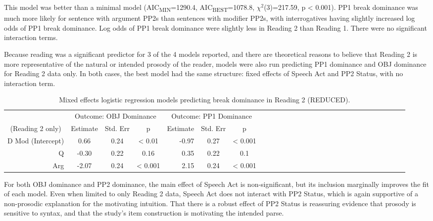 \documentclass[12pt,oneside]{book}
\begin{document}
This model was better than a minimal model (AIC\textsubscript{MIN}=1290.4, AIC\textsubscript{BEST}=1078.8, \(\chi^2\)(3)=217.59, p \textless{} 0.001). PP1 break dominance was much more likely for sentence with argument PP2s than sentences with modifier PP2s, with interrogatives having slightly increased log odds of PP1 break dominance. Log odds of PP1 break dominance were slightly less in Reading 2 than Reading 1. There were no significant interaction terms.

Because reading was a significant predictor for 3 of the 4 models reported, and there are theoretical reasons to believe that Reading 2 is more representative of the natural or intended prosody of the reader, models were also run predicting PP1 dominance and OBJ dominance for Reading 2 data only. In both cases, the best model had the same structure: fixed effects of Speech Act and PP2 Status, with no interaction term.

\begin{table}[!h]

\caption{\label{tab:r2dom}Mixed effects logistic regression models predicting break dominance in Reading 2 (REDUCED).}
\centering
\begin{tabular}{rcccrcccrcccrcccrcccrcccrccc}
\toprule
\multicolumn{1}{c}{ } & \multicolumn{3}{c}{Outcome: OBJ Dominance} & \multicolumn{3}{c}{Outcome: PP1 Dominance} \\
\cmidrule(l{3pt}r{3pt}){2-4} \cmidrule(l{3pt}r{3pt}){5-7}
\multicolumn{1}{c}{(Reading 2 only)} & \multicolumn{1}{c}{Estimate} & \multicolumn{1}{c}{Std. Err} & \multicolumn{1}{c}{p} & \multicolumn{1}{c}{Estimate} & \multicolumn{1}{c}{Std. Err} & \multicolumn{1}{c}{p}\\
\midrule
D Mod (Intercept) & 0.66 & 0.24 & < 0.01 & -0.97 & 0.27 & < 0.001\\
Q & -0.30 & 0.22 & 0.16 & 0.35 & 0.22 & 0.1\\
Arg & -2.07 & 0.24 & < 0.001 & 2.15 & 0.24 & < 0.001\\
\bottomrule
\end{tabular}
\end{table}

For both OBJ dominance and PP2 dominance, the main effect of Speech Act is non-significant, but its inclusion marginally improves the fit of each model. Even when limited to only Reading 2 data, Speech Act does not interact with PP2 Status, which is again supportive of a non-prosodic explanation for the motivating intuition. That there is a robust effect of PP2 Status is reassuring evidence that prosody is sensitive to syntax, and that the study's item construction is motivating the intended parse.
\end{document}
